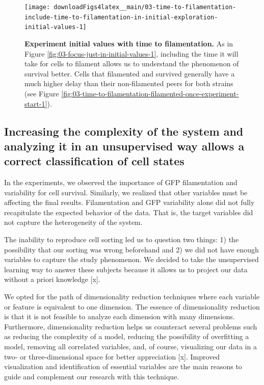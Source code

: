 \documentclass[a4paper, nobind]{templates/ociamthesis}
\begin{document}
\begin{figure}[H]
\texttt{[image: downloadFigs4latex\_\_main/03-time-to-filamentation-include-time-to-filamentation-in-initial-exploration-initial-values-1]} \caption[Experiment initial values with time to filamentation.]{\textbf{Experiment initial values with time to filamentation.} As in Figure \ref{fig:03-focus-just-in-initial-values-1}, including the time it will take for cells to filament allows us to understand the phenomenon of survival better. Cells that filamented and survived generally have a much higher delay than their non-filamented peers for both strains (see Figure \ref{fig:03-time-to-filamentation-filamented-once-experiment-start-1}).}\label{fig:03-time-to-filamentation-include-time-to-filamentation-in-initial-exploration-initial-values-1}
\end{figure}

\hypertarget{increasing-the-complexity-of-the-system-and-analyzing-it-in-an-unsupervised-way-allows-a-correct-classification-of-cell-states}{%
\subsection{Increasing the complexity of the system and analyzing it in an unsupervised way allows a correct classification of cell states}\label{increasing-the-complexity-of-the-system-and-analyzing-it-in-an-unsupervised-way-allows-a-correct-classification-of-cell-states}}

In the experiments, we observed the importance of GFP filamentation and variability for cell survival.
Similarly, we realized that other variables must be affecting the final results.
Filamentation and GFP variability alone did not fully recapitulate the expected behavior of the data.
That is, the target variables did not capture the heterogeneity of the system.

The inability to reproduce cell sorting led us to question two things: 1) the possibility that our sorting was wrong beforehand and 2) we did not have enough variables to capture the study phenomenon.
We decided to take the unsupervised learning way to answer these subjects because it allows us to project our data without a priori knowledge {[}x{]}.

We opted for the path of dimensionality reduction techniques where each variable or feature is equivalent to one dimension.
The essence of dimensionality reduction is that it is not feasible to analyze each dimension with many dimensions.
Furthermore, dimensionality reduction helps us counteract several problems such as reducing the complexity of a model, reducing the possibility of overfitting a model, removing all correlated variables, and, of course, visualizing our data in a two- or three-dimensional space for better appreciation {[}x{]}.
Improved visualization and identification of essential variables are the main reasons to guide and complement our research with this technique.
\end{document}
